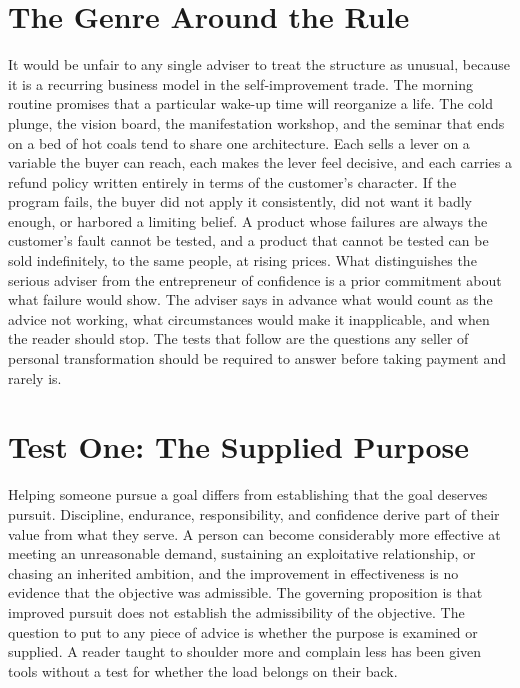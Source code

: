 \documentclass[12pt]{article}
\begin{document}
\section{The Genre Around the Rule}\label{sec:genre}

It would be unfair to any single adviser to treat the structure as unusual, because it is a recurring business model in the self-improvement trade. The morning routine promises that a particular wake-up time will reorganize a life. The cold plunge, the vision board, the manifestation workshop, and the seminar that ends on a bed of hot coals tend to share one architecture. Each sells a lever on a variable the buyer can reach, each makes the lever feel decisive, and each carries a refund policy written entirely in terms of the customer's character. If the program fails, the buyer did not apply it consistently, did not want it badly enough, or harbored a limiting belief. A product whose failures are always the customer's fault cannot be tested, and a product that cannot be tested can be sold indefinitely, to the same people, at rising prices. What distinguishes the serious adviser from the entrepreneur of confidence is a prior commitment about what failure would show. The adviser says in advance what would count as the advice not working, what circumstances would make it inapplicable, and when the reader should stop. The tests that follow are the questions any seller of personal transformation should be required to answer before taking payment and rarely is.

\section{Test One: The Supplied Purpose}\label{sec:t1}

Helping someone pursue a goal differs from establishing that the goal deserves pursuit. Discipline, endurance, responsibility, and confidence derive part of their value from what they serve. A person can become considerably more effective at meeting an unreasonable demand, sustaining an exploitative relationship, or chasing an inherited ambition, and the improvement in effectiveness is no evidence that the objective was admissible. The governing proposition is that improved pursuit does not establish the admissibility of the objective. The question to put to any piece of advice is whether the purpose is examined or supplied. A reader taught to shoulder more and complain less has been given tools without a test for whether the load belongs on their back.
\end{document}
